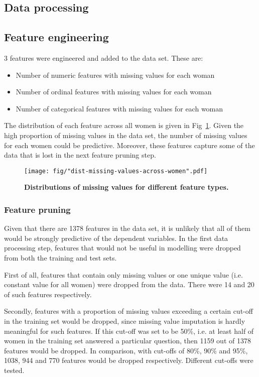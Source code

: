 \documentclass{article}\usepackage[]{graphicx}\usepackage[]{color}
\begin{document}
\subsection{Data processing}
\subsection{Feature engineering}
3 features were engineered and added to the data set. These are:
\begin{itemize}
  \item Number of numeric features with missing values for each woman
  \item Number of ordinal features with missing values for each woman
  \item Number of categorical features with missing values for each woman
\end{itemize}

The distribution of each feature across all women is given in Fig~\ref{fig-feature-engin}. Given the high proportion of missing values in the data set, the number of missing values for each women could be predictive. Moreover, these features capture some of the data that is lost in the next feature pruning step.

\begin{figure}[htbp]
    \begin{center}
  	\texttt{[image: fig/"dist-missing-values-across-women".pdf]}
		\caption{\textbf{Distributions of missing values for different feature types.}}
		\label{fig-feature-engin}
  \end{center}
\end{figure}

\subsubsection{Feature pruning}
Given that there are 1378 features in the data set, it is unlikely that all of them would be strongly predictive of the dependent variables. In the first data processing step, features that would not be useful in modelling were dropped from both the training and test sets.

First of all, features that contain only missing values or one unique value (i.e. constant value for all women) were dropped from the data. There were 14 and 20 of such features respectively.

Secondly, features with a proportion of missing values exceeding a certain cut-off in the training set would be dropped, since missing value imputation is hardly meaningful for such features. If this cut-off was set to be 50\%, i.e. at least half of women in the training set answered a particular question, then 1159 out of 1378 features would be dropped. In comparison, with cut-offs of 80\%, 90\% and 95\%, 1038, 944 and 770 features would be dropped respectively. Different cut-offs were tested.
\end{document}
